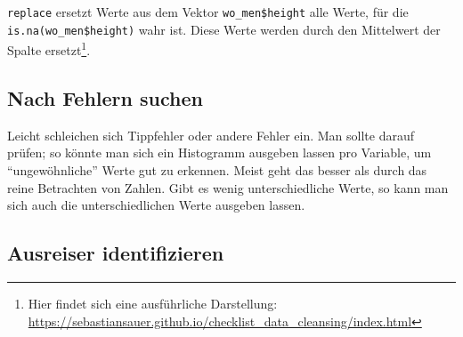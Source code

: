 \documentclass[12pt,]{book}
\makeatletter
\newenvironment{Shaded}{\begin{snugshade}}{\end{snugshade}}
\newcommand{\KeywordTok}[1]{\textcolor[rgb]{0.13,0.29,0.53}{\textbf{{#1}}}}
\newcommand{\DataTypeTok}[1]{\textcolor[rgb]{0.13,0.29,0.53}{{#1}}}
\newcommand{\StringTok}[1]{\textcolor[rgb]{0.31,0.60,0.02}{{#1}}}
\newcommand{\CommentTok}[1]{\textcolor[rgb]{0.56,0.35,0.01}{\textit{{#1}}}}
\newcommand{\OtherTok}[1]{\textcolor[rgb]{0.56,0.35,0.01}{{#1}}}
\newcommand{\NormalTok}[1]{{#1}}
\newenvironment{kframe}{%
\medskip{}
\setlength{\fboxsep}{.8em}
 \def\at@end@of@kframe{}%
 \ifinner\ifhmode%
  \def\at@end@of@kframe{\end{minipage}}%
  \begin{minipage}{\columnwidth}%
 \fi\fi%
 \def\FrameCommand##1{\hskip\@totalleftmargin \hskip-\fboxsep
 \colorbox{shadecolor}{##1}\hskip-\fboxsep
     \hskip-\linewidth \hskip-\@totalleftmargin \hskip\columnwidth}%
 \MakeFramed {\advance\hsize-\width
   \@totalleftmargin\z@ \linewidth\hsize
   \@setminipage}}%
 {\par\unskip\endMakeFramed%
 \at@end@of@kframe}
\renewenvironment{Shaded}{\begin{kframe}}{\end{kframe}}
\makeatother
\begin{document}
\begin{Shaded}
\end{Shaded}

\texttt{replace} ersetzt Werte aus dem Vektor \texttt{wo\_men\$height}
alle Werte, für die \texttt{is.na(wo\_men\$height)} wahr ist. Diese
Werte werden durch den Mittelwert der Spalte ersetzt\footnote{Hier
  findet sich eine ausführliche Darstellung:
  \url{https://sebastiansauer.github.io/checklist_data_cleansing/index.html}}.

\subsection{Nach Fehlern suchen}\label{nach-fehlern-suchen}

Leicht schleichen sich Tippfehler oder andere Fehler ein. Man sollte
darauf prüfen; so könnte man sich ein Histogramm ausgeben lassen pro
Variable, um ``ungewöhnliche'' Werte gut zu erkennen. Meist geht das
besser als durch das reine Betrachten von Zahlen. Gibt es wenig
unterschiedliche Werte, so kann man sich auch die unterschiedlichen
Werte ausgeben lassen.

\begin{Shaded}
\end{Shaded}

\subsection{Ausreiser identifizieren}\label{ausreiser-identifizieren}
\end{document}
